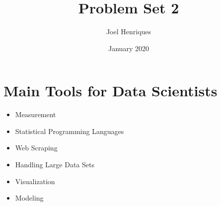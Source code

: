 \documentclass{article}
\title{Problem Set 2}
\author{Joel Henriques}
\date{January 2020}
\begin{document}
\maketitle

\section{Main Tools for Data Scientists}

\begin{itemize}
    \item Measurement
    \item Statistical Programming Languages
    \item Web Scraping 
    \item Handling Large Data Sets 
    \item Visualization 
    \item Modeling 
\end{itemize}



\end{document}
